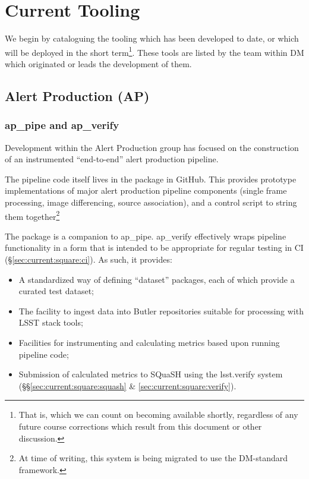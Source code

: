 \documentclass[DM,authoryear,toc,lsstdraft]{lsstdoc}
\begin{document}
\section{Current Tooling}
\label{sec:current}

We begin by cataloguing the tooling which has been developed to date, or which
will be deployed in the short term\footnote{That is, which we can count on
becoming available shortly, regardless of any future course corrections which
result from this document or other discussion.}. These tools are listed by the
team within DM which originated or leads the development of them.

\subsection{Alert Production (AP)}
\label{sec:current:ap}

\subsubsection{ap\_pipe and ap\_verify}

Development within the Alert Production group has focused on the construction
of an instrumented ``end-to-end'' alert production pipeline.

The pipeline code itself lives in the  package in
GitHub. This provides prototype implementations of major alert production
pipeline components (single frame processing, image differencing, source
association), and a control script to string them together\footnote{At time of
writing, this system is being migrated to use the DM-standard
 framework.}

The  package is a companion to ap\_pipe. ap\_verify
effectively wraps pipeline functionality in a form that is intended to be
appropriate for regular testing in CI (\S\ref{sec:current:square:ci}). As
such, it provides:

\begin{itemize}

  \item{A standardized way of defining ``dataset'' packages, each of which
  provide a curated test dataset;}
  \item{The facility to ingest data into Butler repositories suitable for
  processing with LSST stack tools;}
  \item{Facilities for instrumenting and calculating \glspl{metric} based upon
  running pipeline code;}
  \item{Submission of calculated \glspl{metric} to SQuaSH using the lsst.verify
  system (\S\S\ref{sec:current:square:squash} \&
  \ref{sec:current:square:verify}).}

\end{itemize}
\end{document}
